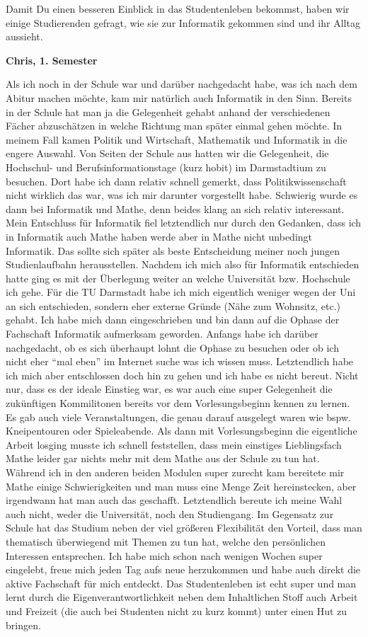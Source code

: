 {Damit Du einen besseren Einblick in das Studentenleben bekommst, haben wir einige Studierenden gefragt, wie sie zur Informatik gekommen sind und ihr Alltag aussieht.%
}
{\textbf{Chris, 1. Semester}

Als ich noch in der Schule war und darüber nachgedacht habe, was ich nach dem Abitur machen möchte, kam mir natürlich auch Informatik in den Sinn. Bereits in der Schule hat man ja die Gelegenheit gehabt anhand der verschiedenen Fächer abzuschätzen in welche Richtung man später einmal gehen möchte. In meinem Fall kamen Politik und Wirtschaft, Mathematik und Informatik in die engere Auswahl. Von Seiten der Schule aus hatten wir die Gelegenheit, die Hochschul- und Berufsinformationstage (kurz hobit) im Darmstadtium zu besuchen. Dort habe ich dann relativ schnell gemerkt, dass Politikwissenschaft nicht wirklich das war, was ich mir darunter vorgestellt habe. Schwierig wurde es dann bei Informatik und Mathe, denn beides klang an sich relativ interessant. Mein Entschluss für Informatik fiel letztendlich nur durch den Gedanken, dass ich in Informatik auch Mathe haben werde aber in Mathe nicht unbedingt Informatik. Das sollte sich später als beste Entscheidung meiner noch jungen Studienlaufbahn herausstellen. Nachdem ich mich also für Informatik entschieden hatte ging es mit der Überlegung weiter an welche Universität bzw. Hochschule ich gehe. Für die TU Darmstadt habe ich mich eigentlich weniger wegen der Uni an sich entschieden, sondern eher externe Gründe (Nähe zum Wohnsitz, etc.) gehabt. Ich habe mich dann eingeschrieben und bin dann auf die Ophase der Fachschaft Informatik aufmerksam geworden. Anfangs habe ich darüber nachgedacht, ob es sich überhaupt lohnt die Ophase zu besuchen oder ob ich nicht eher "`mal eben"' im Internet suche was ich wissen muss. Letztendlich habe ich mich aber entschlossen doch hin zu gehen und ich habe es nicht bereut. Nicht nur, dass es der ideale Einstieg war, es war auch eine super Gelegenheit die zukünftigen Kommilitonen bereits vor dem Vorlesungsbeginn kennen zu lernen. Es gab auch viele Veranstaltungen, die genau darauf ausgelegt waren wie bspw. Kneipentouren oder Spieleabende. Als dann mit Vorlesungsbeginn die eigentliche Arbeit losging musste ich schnell feststellen, dass mein einstiges Lieblingsfach Mathe leider gar nichts mehr mit dem Mathe aus der Schule zu tun hat. Während ich in den anderen beiden Modulen super zurecht kam bereitete mir Mathe einige Schwierigkeiten und man muss eine Menge Zeit hereinstecken, aber irgendwann hat man auch das geschafft. Letztendlich bereute ich meine Wahl auch nicht, weder die Universität, noch den Studiengang. Im Gegensatz zur Schule hat das Studium neben der viel größeren Flexibilität den Vorteil, dass man thematisch überwiegend mit Themen zu tun hat, welche den persönlichen Interessen entsprechen. Ich habe mich schon nach wenigen Wochen super eingelebt, freue mich jeden Tag aufs neue herzukommen und habe auch direkt die aktive Fachschaft für mich entdeckt. Das Studentenleben ist echt super und man lernt durch die Eigenverantwortlichkeit neben dem Inhaltlichen Stoff auch Arbeit und Freizeit (die auch bei Studenten nicht zu kurz kommt) unter einen Hut zu bringen.\\

}
